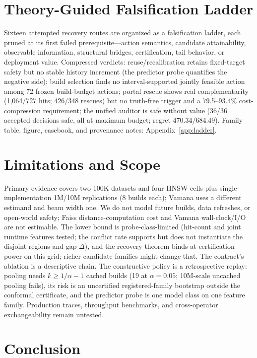 \documentclass{article}
\begin{document}
\section{Theory-Guided Falsification Ladder}
\label{sec:ladder}

Sixteen attempted recovery routes are organized as a falsification ladder, each pruned at its first
failed prerequisite---action semantics, candidate attainability, observable information, structural
bridges, certification, tail behavior, or deployment value. Compressed verdicts: reuse/recalibration
retains fixed-target safety but no stable history increment (the predictor probe quantifies the negative
side); build selection finds no interval-supported jointly feasible action among 72 frozen
build-budget actions; portal rescue shows real complementarity (1{,}064/727 hits; 426/348 rescues) but no
truth-free trigger and a 79.5--93.4\% cost-compression requirement; the unified auditor is safe without
value (36/36 accepted decisions safe, all at maximum budget; regret 470.34/684.49). Family table, figure,
casebook, and provenance notes: Appendix~\ref{app:ladder}.

\section{Limitations and Scope}
\label{sec:limitations}

Primary evidence covers two 100K datasets and four HNSW cells plus single-implementation 1M/10M
replications (8 builds each); Vamana uses a different estimand and beam width one. We do not model future
builds, data refreshes, or open-world safety; Faiss distance-computation cost and Vamana wall-clock/I/O
are not estimable. The lower bound is probe-class-limited (hit-count and joint runtime features tested;
the conflict rate supports but does not instantiate the disjoint regions and gap $\Delta$), and the
recovery theorem binds at certification power on this grid; richer candidate families might change that.
The contract's ablation is a descriptive chain. The constructive policy is a retrospective replay:
pooling needs $k\ge 1/\alpha-1$ cached builds (19 at $\alpha{=}0.05$; 10M-scale uncached pooling
fails), its risk is an uncertified registered-family bootstrap outside the conformal certificate, and the
predictor probe is one model class on one feature family. Production traces, throughput benchmarks, and cross-operator exchangeability remain untested.

\section{Conclusion}
\label{sec:conclusion}
\end{document}
